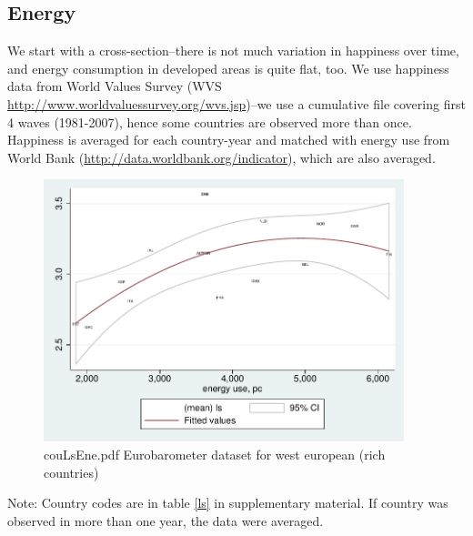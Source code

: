 \documentclass[10pt, letterpaper]{article}
\begin{document}
\begin{spacing}{1.4}

\subsection{Energy}

We start with a cross-section--there is not much variation in happiness over
time, and energy consumption in developed areas is quite flat, too. 
We use happiness data from World Values Survey
(WVS \url{http://www.worldvaluessurvey.org/wvs.jsp})--we use a cumulative file
covering first 4 waves (1981-2007), hence some countries are observed more than
once. Happiness is averaged for each country-year and matched with energy use
 from World Bank (\url{http://data.worldbank.org/indicator}), which are also averaged. 

\begin{figure}[H]
 \includegraphics[height=3in]{graphsAndTables/couLsEne.pdf}\centering
\caption{couLsEne.pdf Eurobarometer dataset for west european (rich countries)}\label{couLsEne.pdf}
\end{figure}
{\scriptsize Note: Country codes are in table \ref{ls} in supplementary
  material. If country was observed in more than one year, the data were averaged.}


\end{spacing}
\end{document}

